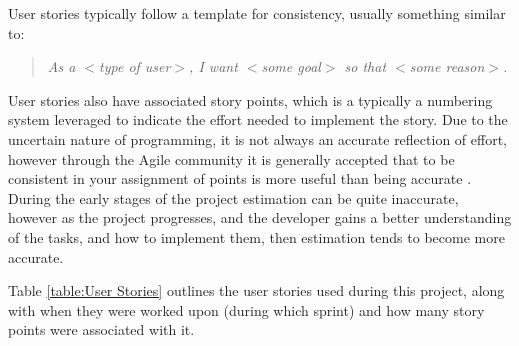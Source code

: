 User stories typically follow a template for consistency, usually something similar to:

\begin{quotation}
  \textit{As a $<$type of user$>$, I want $<$some goal$>$ so that $<$some reason$>$.} \cite{user_story}
\end{quotation}

User stories also have associated story points, which is a typically a numbering system leveraged to indicate the effort needed to implement the story. Due to the uncertain nature of programming, it is not always an accurate reflection of effort, however through the Agile community it is generally accepted that to be consistent in your assignment of points is more useful than being accurate \cite{estimation}. During the early stages of the project estimation can be quite inaccurate, however as the project progresses, and the developer gains a better understanding of the tasks, and how to implement them, then estimation tends to become more accurate.

Table \ref{table:User Stories} outlines the user stories used during this project, along with when they were worked upon (during which sprint) and how many story points were associated with it.

